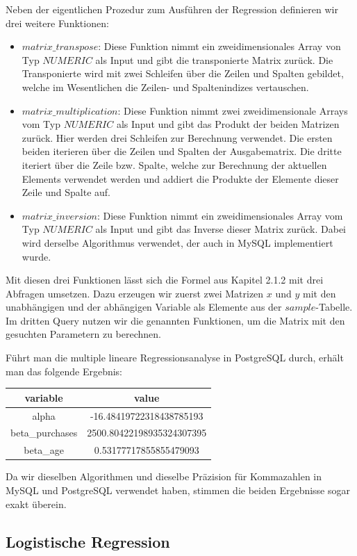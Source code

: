 Neben der eigentlichen Prozedur zum Ausführen der Regression definieren wir drei weitere Funktionen:
\begin{itemize}
  \item $matrix\_transpose$: Diese Funktion nimmt ein zweidimensionales Array von Typ $NUMERIC$ als Input und gibt die transponierte Matrix zurück. Die Transponierte wird mit zwei Schleifen über die Zeilen und Spalten gebildet, welche im Wesentlichen die Zeilen- und Spaltenindizes vertauschen.
  \item $matrix\_multiplication$: Diese Funktion nimmt zwei zweidimensionale Arrays vom Typ $NUMERIC$ als Input und gibt das Produkt der beiden Matrizen zurück. Hier werden drei Schleifen zur Berechnung verwendet. Die ersten beiden iterieren über die Zeilen und Spalten der Ausgabematrix. Die dritte iteriert über die Zeile bzw. Spalte, welche zur Berechnung der aktuellen Elements verwendet werden und addiert die Produkte der Elemente dieser Zeile und Spalte auf.
  \item $matrix\_inversion$: Diese Funktion nimmt ein zweidimensionales Array vom Typ $NUMERIC$ als Input und gibt das Inverse dieser Matrix zurück. Dabei wird derselbe Algorithmus verwendet, der auch in MySQL implementiert wurde.
\end{itemize}

Mit diesen drei Funktionen lässt sich die Formel aus Kapitel 2.1.2 mit drei Abfragen umsetzen. Dazu erzeugen wir zuerst zwei Matrizen $x$ und $y$ mit den unabhängigen und der abhängigen Variable als Elemente aus der $sample$-Tabelle. Im dritten Query nutzen wir die genannten Funktionen, um die Matrix mit den gesuchten Parametern zu berechnen.

Führt man die multiple lineare Regressionsanalyse in PostgreSQL durch, erhält man das folgende Ergebnis:

\begin{center}
  \begin{tabular}{|c|c|}\hline
    \textbf{variable} & \textbf{value} \\ \hline
    alpha & -16.48419722318438785193 \\ \hline
    beta\_purchases & 2500.80422198935324307395 \\ \hline
    beta\_age & 0.53177717855855479093 \\ \hline
  \end{tabular}
\end{center}

Da wir dieselben Algorithmen und dieselbe Präzision für Kommazahlen in MySQL und PostgreSQL verwendet haben, stimmen die beiden Ergebnisse sogar exakt überein.

\subsection{Logistische Regression}
